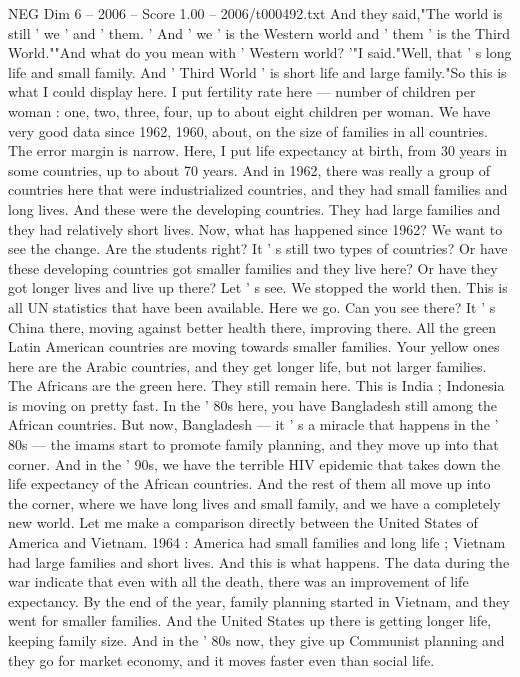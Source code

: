 \begin{textsample}{NEG Dim 6 – 2006 – Score 1.00 – 2006/t000492.txt}
And they said,"The world is still ' we ' and ' them. ' And ' we ' is the Western world and ' them ' is the Third World.""And what do you mean with ' Western world? '"I said."Well, that ' s long life and small family.
And ' Third World ' is short life and large family."So this is what I could display here.
I put fertility rate here — number of children per woman : one, two, three, four, up to about eight children per woman.
We have very good data since 1962, 1960, about, on the size of families in all countries.
The error margin is narrow.
Here, I put life expectancy at birth, from 30 years in some countries, up to about 70 years.
And in 1962, there was really a group of countries here that were industrialized countries, and they had small families and long lives.
And these were the developing countries.
They had large families and they had relatively short lives.
Now, what has happened since 1962?
We want to see the change.
Are the students right?
It ' s still two types of countries?
Or have these developing countries got smaller families and they live here?
Or have they got longer lives and live up there?
Let ' s see.
We stopped the world then.
This is all UN statistics that have been available.
Here we go.
Can you see there?
It ' s China there, moving against better health there, improving there.
All the green Latin American countries are moving towards smaller families.
Your yellow ones here are the Arabic countries, and they get longer life, but not larger families.
The Africans are the green here.
They still remain here.
This is India ; Indonesia is moving on pretty fast.
In the ' 80s here, you have Bangladesh still among the African countries.
But now, Bangladesh — it ' s a miracle that happens in the ' 80s — the imams start to promote family planning, and they move up into that corner.
And in the ' 90s, we have the terrible HIV epidemic that takes down the life expectancy of the African countries.
And the rest of them all move up into the corner, where we have long lives and small family, and we have a completely new world.
Let me make a comparison directly between the United States of America and Vietnam. 1964 : America had small families and long life ; Vietnam had large families and short lives.
And this is what happens.
The data during the war indicate that even with all the death, there was an improvement of life expectancy.
By the end of the year, family planning started in Vietnam, and they went for smaller families.
And the United States up there is getting longer life, keeping family size.
And in the ' 80s now, they give up Communist planning and they go for market economy, and it moves faster even than social life.

\end{textsample}
